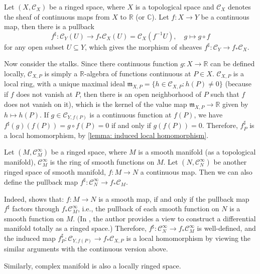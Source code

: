 \documentclass[11pt]{article}
\begin{document}
\begin{example}
  Let $ (X,\mathscr{C}_{X}) $ be a ringed space, 
  where $ X $ is a topological space and $ \mathscr{C}_{X} $ 
  denotes the sheaf of continuous maps from $ X $ to $ \mathbb{R} $ 
  (or $ \mathbb{C} $). 
  Let $ f: X \to Y $ be a continuous map, then there is a pullback  
  $$f^{\sharp}: \mathscr{C}_{Y}(U) \to f_{*}\mathscr{C}_{X}(U) = 
  \mathscr{C}_{X}(f^{-1}U), \quad g \mapsto g \circ f$$ 
  for any open subset $ U \subseteq Y $, 
  which gives the morphism of sheaves 
  $ f^{\sharp} :\mathscr{C}_{Y} \to  f_{*}\mathscr{C}_{X} $. 

  Now consider the stalks. Since there continuous function 
  $ g: X \to \mathbb{R} $ can be defined locally, 
  $ \mathscr{C}_{X,P} $ is simply a $ \mathbb{R} $-algebra 
  of functions continuous at $ P \in X $. 
  $ \mathscr{C}_{X,P} $ is a local ring, with a unique maximal 
  ideal $ \mathfrak{m}_{X,P}=\{h \in \mathscr{C}_{X,P}: h(P) \neq 0\} $ 
  (because if $ f $ does not vanish at $ P $, then there is an 
  open neighborhood of $ P $ such that $ f $ does not vanish on it), 
  which is the kernel of the value map 
  $ \mathfrak{m}_{X,P} \to \mathbb{R} $ given by $ h \mapsto h(P) $. 
  If $ g \in \mathscr{C}_{Y,f(P)} $ is a continuous 
  function at $ f(P) $, we have 
  $ f^{\sharp}(g)(f(P)) = g \circ f(P) =0 $ if and only if 
  $ g(f(P))=0 $. Therefore, $ f^{\sharp}_{P} $ is a local homomorphism, 
  by \ref{lemma: induced local homomorphism}. 
\end{example}

\begin{example}
  Let $ (M,\mathscr{C}^{\infty}_{M}) $ be a ringed space, 
  where $ M $ is a smooth manifold (as a topological manifold), 
  $ \mathscr{C}^{\infty}_{M} $ is the ring of smooth functions 
  on $ M $. Let $ (N,\mathscr{C}^{\infty}_{N}) $ be another 
  ringed space of smooth manifold, $ f: M \to N $ a continuous map. 
  Then we can also define the pullback map 
  $ f^{\sharp}: \mathscr{C}^{\infty}_{N} \to f_{*}\mathscr{C}_{M} $. 

  Indeed, \cite[Proposition 4.18]{WedhornManifolds} shows that: 
  $ f: M \to N $ is a smooth map, if and only if 
  the pullback map $ f^{\sharp} $ factors through $ f_{*}\mathscr{C}_{M}^{\infty} $, 
  i.e., the pullback of each smooth function on $ N $ is a smooth function on $ M $. 
  (In \cite{WedhornManifolds}, the author provides a view to construct a differential 
  manifold totally as a ringed space.) Therefore, 
  $ f^{\sharp}: \mathscr{C}^{\infty}_{N} \to f_{*}\mathscr{C}_{M}^{\infty} $ is well-defined, 
  and the induced map $ f^{\sharp}_{P}:\mathscr{C}_{Y,f(P)} \to  f_{*}\mathscr{C}_{X,P}  $ 
  is a local homomorphism by viewing the similar arguments with the continuous version above. 

  Similarly, complex manifold is also a locally ringed space. 
\end{example}
\end{document}

